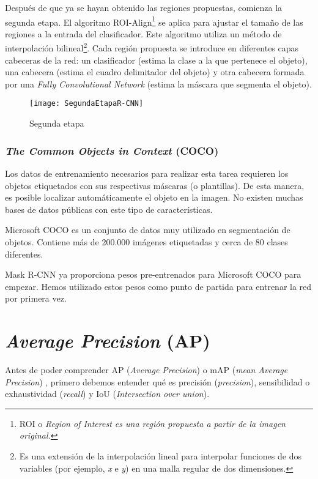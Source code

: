Después de que ya se hayan obtenido las regiones propuestas, comienza la segunda etapa. El algoritmo ROI-Align\footnote{ROI o \textit{Region of Interest es una región propuesta a partir de la imagen original.}} \cite{segmentacionimagenes:MaskR-CNN} se aplica para ajustar el tamaño de las regiones a la entrada del clasificador. Este algoritmo utiliza un método de interpolación bilineal\footnote{Es una extensión de la interpolación lineal para interpolar funciones de dos variables (por ejemplo, \textit{x} e \textit{y}) en una malla regular de dos dimensiones.}. Cada región propuesta se introduce en diferentes capas cabeceras de la red: un clasificador (estima la clase a la que pertenece el objeto), una cabecera (estima el cuadro delimitador del objeto) y otra cabecera formada por una \textit{Fully Convolutional Network} (estima la máscara que segmenta el objeto).

\begin{figure}[htb]
	\centering
	\texttt{[image: SegundaEtapaR-CNN]}
	\caption[Segunda etapa]{Segunda etapa \cite{segmentacionimagenes:marcoR-CNN}}
\end{figure}

\subsubsection{\textit{The Common Objects in Context} (COCO)}

Los datos de entrenamiento necesarios para realizar esta tarea requieren los objetos etiquetados con sus respectivas máscaras (o plantillas). De esta manera, es posible localizar automáticamente el objeto en la imagen. No existen muchas bases de datos públicas con este tipo de características.

Microsoft COCO \cite{segmentacionimagenes:COCO} es un conjunto de datos muy utilizado en segmentación de objetos. Contiene más de 200.000 imágenes etiquetadas y cerca de 80 clases diferentes.

Mask R-CNN \cite{segmentacionimagenes:MaskR-CNN2} ya proporciona pesos pre-entrenados para Microsoft COCO para empezar. Hemos utilizado estos pesos como punto de partida para entrenar la red por primera vez.

\section{\textit{Average Precision} (AP)\label{SectionAP}}

Antes de poder comprender AP (\textit{Average Precision}) o mAP (\textit{mean Average Precision}) \cite{AP}\cite{mAP}, primero debemos entender qué es precisión (\textit{precision}), sensibilidad o exhaustividad (\textit{recall}) y IoU (\textit{Intersection over union}).

